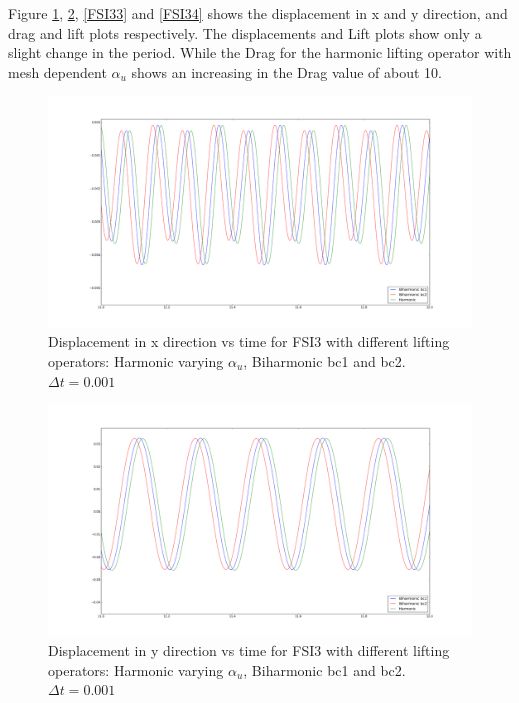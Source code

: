 Figure \ref{FSI31}, \ref{FSI32}, \ref{FSI33} and \ref{FSI34} shows the displacement in x and y direction, and drag and lift plots respectively. The displacements and Lift plots show only a slight change in the period. While the Drag for the harmonic lifting operator with mesh dependent $\alpha_u$ shows an increasing in the Drag value of about 10.

\begin{figure}[H] 
    \centering	
    \includegraphics[trim={3cm 3cm 3cm 3cm},clip,scale=0.20]{./Mesh_motion_results/FSI3_dt0001_dis_x.png} 
    \caption{Displacement in x direction vs time for FSI3 with different lifting operators: Harmonic varying $\alpha_u$, Biharmonic bc1 and bc2. $\Delta t = 0.001$}
    \label{FSI31}
\end{figure}
\begin{figure}[H]
    \centering
    \includegraphics[trim={3cm 3cm 3cm 3cm},scale=0.20]{./Mesh_motion_results/FSI3_dt0001_dis_y.png} 
    \caption{Displacement in y direction vs time for FSI3 with different lifting operators: Harmonic varying $\alpha_u$, Biharmonic bc1 and bc2. $\Delta t = 0.001$}
    \label{FSI32}
\end{figure}
